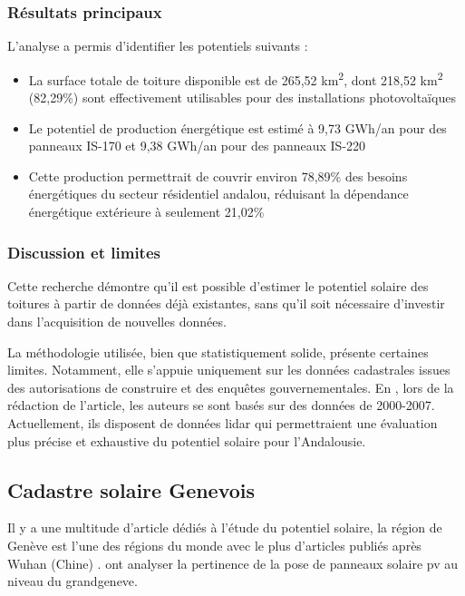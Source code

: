 \subsubsection{Résultats principaux}
\par{L'analyse a permis d'identifier les potentiels suivants :}
\begin{itemize}
    \item La surface totale de toiture disponible est de 265,52 \si{\unit{km^2}}, dont 218,52 \si{\unit{km^2}} (82,29\%) sont effectivement utilisables pour des installations photovoltaïques
    \item Le potentiel de production énergétique est estimé à 9,73 \si{\unit{GWh/an}} pour des panneaux IS-170 et 9,38 \si{\unit{GWh/an}} pour des panneaux IS-220
    \item Cette production permettrait de couvrir environ 78,89\% des besoins énergétiques du secteur résidentiel andalou, réduisant la dépendance énergétique extérieure à seulement 21,02\%
\end{itemize}

\subsubsection{Discussion et limites}
\par{Cette recherche démontre qu'il est possible d'estimer le potentiel solaire des toitures à partir de données déjà existantes, sans qu'il soit nécessaire d'investir dans l’acquisition de nouvelles données.}

\par{La méthodologie utilisée, bien que statistiquement solide, présente certaines limites. Notamment, elle s'appuie uniquement sur les données cadastrales issues des autorisations de construire et des enquêtes gouvernementales. En \citeyear{ordonez_analysis_2010}, lors de la rédaction de l'article, les auteurs se sont basés sur des données de 2000-2007. Actuellement, ils disposent de données \gls{lidar} \cite{nacional_plan_nodate} qui permettraient une évaluation plus précise et exhaustive du potentiel solaire pour l'Andalousie.}

\subsection{Cadastre solaire Genevois}

\par{Il y a une multitude d'article dédiés à l'étude du potentiel solaire, la région de Genève est l'une des régions du monde avec le plus d'articles publiés après Wuhan (Chine) \cite{drozd_evaluating_2025}. \citeauthor{thebault_large-scale_2022} \cite{thebault_large-scale_2022} ont analyser la pertinence de la pose de panneaux solaire \acrshort{pv} au niveau du \gls{grandgeneve}.}

